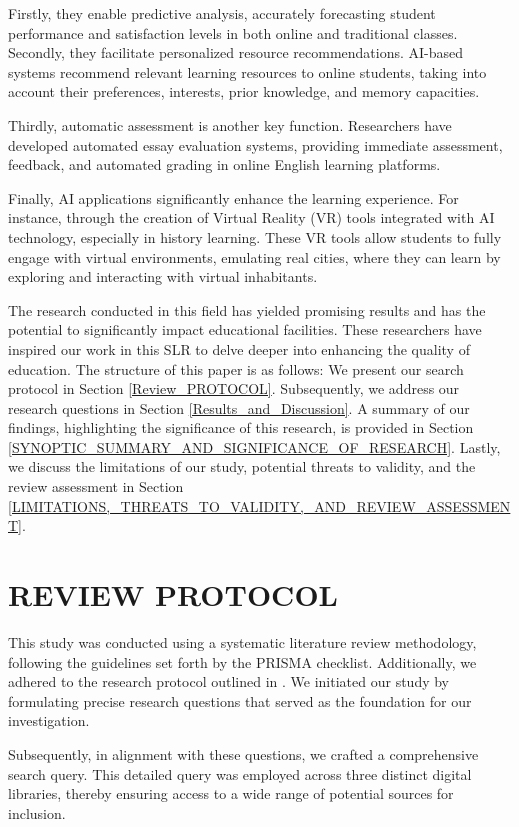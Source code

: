 \documentclass{svproc}
\begin{document}
Firstly, they enable predictive analysis, accurately forecasting student performance and satisfaction levels in both online and traditional classes. Secondly, they facilitate personalized resource recommendations. AI-based systems recommend relevant learning resources to online students, taking into account their preferences, interests, prior knowledge, and memory capacities.

Thirdly, automatic assessment is another key function. Researchers have developed automated essay evaluation systems, providing immediate assessment, feedback, and automated grading in online English learning platforms.

Finally, AI applications significantly enhance the learning experience. For instance, through the creation of Virtual Reality (VR) tools integrated with AI technology, especially in history learning. These VR tools allow students to fully engage with virtual environments, emulating real cities, where they can learn by exploring and interacting with virtual inhabitants.

The research conducted in this field has yielded promising results and has the potential to significantly impact educational facilities. These researchers have inspired our work in this SLR to delve deeper into enhancing the quality of education. The structure of this paper is as follows: We present our search protocol in Section \ref{Review_PROTOCOL}. Subsequently, we address our research questions in Section \ref{Results_and_Discussion}. A summary of our findings, highlighting the significance of this research, is provided in Section \ref{SYNOPTIC_SUMMARY_AND_SIGNIFICANCE_OF_RESEARCH}. Lastly, we discuss the limitations of our study, potential threats to validity, and the review assessment in Section \ref{LIMITATIONS,_THREATS_TO_VALIDITY,_AND_REVIEW_ASSESSMENT}.


\section{REVIEW PROTOCOL}
\label{Review PROTOCOL}
This study was conducted using a systematic literature review methodology, following the guidelines set forth by the PRISMA checklist. Additionally, we adhered to the research protocol outlined in \cite{Technologies_for_GQM_Based_Metrics_Recommender_Systems_A_Systematic_Literature_Review}. We initiated our study by formulating precise research questions that served as the foundation for our investigation.

Subsequently, in alignment with these questions, we crafted a comprehensive search query. This detailed query was employed across three distinct digital libraries, thereby ensuring access to a wide range of potential sources for inclusion.
\end{document}
